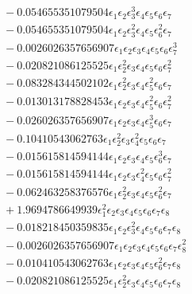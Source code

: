 \documentclass[10pt]{article}
\begin{document}
\begin{align*}
&{}  - 0.054655351079504 \epsilon_{1} \epsilon_{2} \epsilon_{3}^{3} \epsilon_{4} \epsilon_{5} \epsilon_{6} \epsilon_{7} \\
&{}  - 0.054655351079504 \epsilon_{1} \epsilon_{2} \epsilon_{3}^{2} \epsilon_{4} \epsilon_{5} \epsilon_{6}^{2} \epsilon_{7} \\
&{}  - 0.0026026357656907 \epsilon_{1} \epsilon_{2} \epsilon_{3} \epsilon_{4} \epsilon_{5} \epsilon_{6} \epsilon_{7}^{3} \\
&{}  - 0.020821086125525 \epsilon_{1} \epsilon_{2}^{2} \epsilon_{3} \epsilon_{4} \epsilon_{5} \epsilon_{6} \epsilon_{7}^{2} \\
&{}  - 0.083284344502102 \epsilon_{1} \epsilon_{2}^{2} \epsilon_{3} \epsilon_{4} \epsilon_{5}^{2} \epsilon_{6} \epsilon_{7} \\
&{}  - 0.013013178828453 \epsilon_{1} \epsilon_{2} \epsilon_{3} \epsilon_{4} \epsilon_{5}^{2} \epsilon_{6} \epsilon_{7}^{2} \\
&{}  - 0.026026357656907 \epsilon_{1} \epsilon_{2} \epsilon_{3} \epsilon_{4} \epsilon_{5}^{3} \epsilon_{6} \epsilon_{7} \\
&{}  - 0.10410543062763 \epsilon_{1} \epsilon_{2}^{2} \epsilon_{3} \epsilon_{4}^{2} \epsilon_{5} \epsilon_{6} \epsilon_{7} \\
&{}  - 0.015615814594144 \epsilon_{1} \epsilon_{2} \epsilon_{3} \epsilon_{4} \epsilon_{5} \epsilon_{6}^{3} \epsilon_{7} \\
&{}  - 0.015615814594144 \epsilon_{1} \epsilon_{2} \epsilon_{3} \epsilon_{4}^{2} \epsilon_{5} \epsilon_{6} \epsilon_{7}^{2} \\
&{}  - 0.062463258376576 \epsilon_{1} \epsilon_{2}^{2} \epsilon_{3} \epsilon_{4} \epsilon_{5} \epsilon_{6}^{2} \epsilon_{7} \\
&{}  + 1.9694786649939 \epsilon_{1}^{2} \epsilon_{2} \epsilon_{3} \epsilon_{4} \epsilon_{5} \epsilon_{6} \epsilon_{7} \epsilon_{8} \\
&{}  - 0.018218450359835 \epsilon_{1} \epsilon_{2} \epsilon_{3}^{2} \epsilon_{4} \epsilon_{5} \epsilon_{6} \epsilon_{7} \epsilon_{8} \\
&{}  - 0.0026026357656907 \epsilon_{1} \epsilon_{2} \epsilon_{3} \epsilon_{4} \epsilon_{5} \epsilon_{6} \epsilon_{7} \epsilon_{8}^{2} \\
&{}  - 0.010410543062763 \epsilon_{1} \epsilon_{2} \epsilon_{3} \epsilon_{4} \epsilon_{5} \epsilon_{6}^{2} \epsilon_{7} \epsilon_{8} \\
&{}  - 0.020821086125525 \epsilon_{1} \epsilon_{2}^{2} \epsilon_{3} \epsilon_{4} \epsilon_{5} \epsilon_{6} \epsilon_{7} \epsilon_{8} \\

\end{align*}
\end{document}
